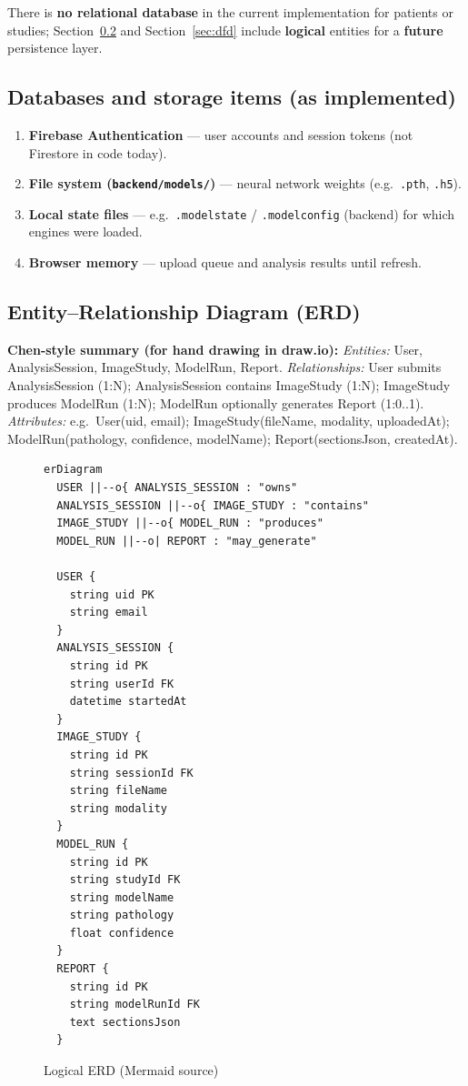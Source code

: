 \documentclass[12pt,a4paper]{report}
\begin{document}
There is \textbf{no relational database} in the current implementation for patients or studies; Section~\ref{sec:erd} and Section~\ref{sec:dfd} include \textbf{logical} entities for a \textbf{future} persistence layer.

\subsection{Databases and storage items (as implemented)}

\begin{enumerate}
  \item \textbf{Firebase Authentication} --- user accounts and session tokens (not Firestore in code today).
  \item \textbf{File system (\texttt{backend/models/})} --- neural network weights (e.g.\ \texttt{.pth}, \texttt{.h5}).
  \item \textbf{Local state files} --- e.g.\ \texttt{.modelstate} / \texttt{.modelconfig} (backend) for which engines were loaded.
  \item \textbf{Browser memory} --- upload queue and analysis results until refresh.
\end{enumerate}

\subsection{Entity--Relationship Diagram (ERD)}
\label{sec:erd}

\textbf{Chen-style summary (for hand drawing in draw.io):}
\textit{Entities:} User, AnalysisSession, ImageStudy, ModelRun, Report.
\textit{Relationships:} User submits AnalysisSession (1:N); AnalysisSession contains ImageStudy (1:N); ImageStudy produces ModelRun (1:N); ModelRun optionally generates Report (1:0..1).
\textit{Attributes:} e.g.\ User(uid, email); ImageStudy(fileName, modality, uploadedAt); ModelRun(pathology, confidence, modelName); Report(sectionsJson, createdAt).

\begin{figure}[htbp]
  \centering
  \begin{verbatim}
erDiagram
  USER ||--o{ ANALYSIS_SESSION : "owns"
  ANALYSIS_SESSION ||--o{ IMAGE_STUDY : "contains"
  IMAGE_STUDY ||--o{ MODEL_RUN : "produces"
  MODEL_RUN ||--o| REPORT : "may_generate"

  USER {
    string uid PK
    string email
  }
  ANALYSIS_SESSION {
    string id PK
    string userId FK
    datetime startedAt
  }
  IMAGE_STUDY {
    string id PK
    string sessionId FK
    string fileName
    string modality
  }
  MODEL_RUN {
    string id PK
    string studyId FK
    string modelName
    string pathology
    float confidence
  }
  REPORT {
    string id PK
    string modelRunId FK
    text sectionsJson
  }
  \end{verbatim}
  \caption{Logical ERD (Mermaid source)}
\end{figure}
\end{document}
